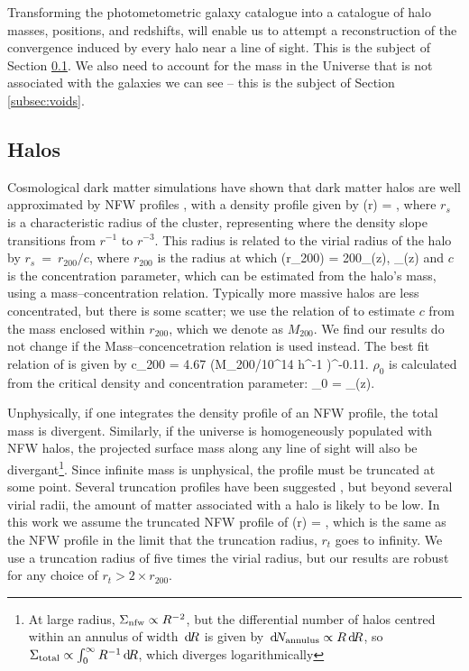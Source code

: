 \documentclass[useAMS,usenatbib]{mn2e}
\begin{document}
Transforming the photometometric galaxy catalogue into a  catalogue of
halo masses, positions, and redshifts, will enable us to attempt a
reconstruction of the convergence induced by every halo near a line of sight.
This is the subject of Section \ref{subsec:halos}. We also need to account for
the mass in the Universe that is not associated with the galaxies we can see
-- this is the subject of Section \ref{subsec:voids}. 

\subsection{Halos}
\label{subsec:halos}

Cosmological dark matter simulations have shown that dark matter
halos are well approximated by NFW profiles \citep{NFW}, with a density
profile given by
\be\label{eq:rhonfw}
\rho(r) = 
,
\ee
where $r_{s}$ is a characteristic radius of the cluster, representing where
the density slope transitions from $r^{-1}$ to $r^{-3}$. This radius is related
to the virial radius of the halo by $r_{s}~=~r_{200}/c$, where $r_{200}$ is the radius at 
which 
\be
\rho(r_{200}) = 200\rho_{{}}(z),  \rho_{}(z) \equiv {}
\ee
and $c$ is the concentration parameter, which can be estimated from the halo's mass,
using a mass--concentration relation. Typically more massive halos are less concentrated,
but there is some scatter; we use the relation of \citet{Neto2007} to estimate $c$
from the mass enclosed within $r_{200}$, which we denote as $M_{200}$. We find our results do not change if the \citet{MaccioEtal2008} Mass--concencetration relation is used instead. The best fit relation of \citet{Neto2007} is given by
\be
c_{200} = 4.67 (M_{200}/10^{14} h^{-1} \Msun)^{-0.11}.
\ee
$\rho_0$ is calculated from the critical density and concentration parameter:
\be
\rho_0 = \rho_{}(z).
\ee


Unphysically, if one integrates the density profile of an NFW profile, the total mass is divergent.
Similarly, if the universe is homogeneously populated with NFW halos, the projected surface mass along any
line of sight will also be divergant\footnote{At large radius, $\Sigma_{\rm
nfw} \propto R^{-2}$, but the differential number of halos centred within an
annulus of width $\, \mathrm{d} \! R$ is given by $\, \mathrm{d} \! N_{\rm annulus} \propto R \, \mathrm{d} \! R$,
so  $\Sigma_{\rm total} \propto \int_{0}^{\infty} R^{-1} \, \mathrm{d} \! R$, which
diverges logarithmically}. Since infinite mass is unphysical, the profile must
be truncated at some point. Several truncation profiles have been suggested \citep[e.g][]{BMO}, but beyond several virial radii, the amount of matter associated with a halo is likely to be low. In this work we assume the truncated NFW profile of \citet{BMO}
\be\label{eq:bmoprofile}
\rho(r) = 
,
\ee
which is the same as the NFW profile in the limit that the truncation radius, $r_t$ goes to infinity. We use a truncation radius of five times the virial radius, but our results are robust for any choice of $r_t>2 \times r_{200}$.
\end{document}
